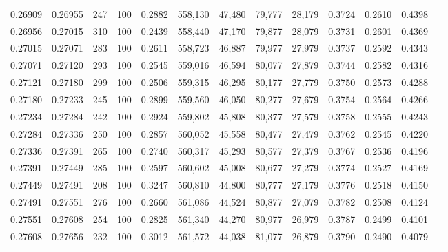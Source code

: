 \begin{tabular}{rrrrrrrrrrrrr}
0.26909 & 0.26955 &   247 & 100 &                                     0.2882 & 558,130 &  47,480 &  79,777 &  28,179 & 0.3724 & 0.2610 & 0.4398 \\
0.26956 & 0.27015 &   310 & 100 &                                     0.2439 & 558,440 &  47,170 &  79,877 &  28,079 & 0.3731 & 0.2601 & 0.4369 \\
0.27015 & 0.27071 &   283 & 100 &                                     0.2611 & 558,723 &  46,887 &  79,977 &  27,979 & 0.3737 & 0.2592 & 0.4343 \\
0.27071 & 0.27120 &   293 & 100 &                                     0.2545 & 559,016 &  46,594 &  80,077 &  27,879 & 0.3744 & 0.2582 & 0.4316 \\
0.27121 & 0.27180 &   299 & 100 &                                     0.2506 & 559,315 &  46,295 &  80,177 &  27,779 & 0.3750 & 0.2573 & 0.4288 \\
0.27180 & 0.27233 &   245 & 100 &                                     0.2899 & 559,560 &  46,050 &  80,277 &  27,679 & 0.3754 & 0.2564 & 0.4266 \\
0.27234 & 0.27284 &   242 & 100 &                                     0.2924 & 559,802 &  45,808 &  80,377 &  27,579 & 0.3758 & 0.2555 & 0.4243 \\
0.27284 & 0.27336 &   250 & 100 &                                     0.2857 & 560,052 &  45,558 &  80,477 &  27,479 & 0.3762 & 0.2545 & 0.4220 \\
0.27336 & 0.27391 &   265 & 100 &                                     0.2740 & 560,317 &  45,293 &  80,577 &  27,379 & 0.3767 & 0.2536 & 0.4196 \\
0.27391 & 0.27449 &   285 & 100 &                                     0.2597 & 560,602 &  45,008 &  80,677 &  27,279 & 0.3774 & 0.2527 & 0.4169 \\
0.27449 & 0.27491 &   208 & 100 &                                     0.3247 & 560,810 &  44,800 &  80,777 &  27,179 & 0.3776 & 0.2518 & 0.4150 \\
0.27491 & 0.27551 &   276 & 100 &                                     0.2660 & 561,086 &  44,524 &  80,877 &  27,079 & 0.3782 & 0.2508 & 0.4124 \\
0.27551 & 0.27608 &   254 & 100 &                                     0.2825 & 561,340 &  44,270 &  80,977 &  26,979 & 0.3787 & 0.2499 & 0.4101 \\
0.27608 & 0.27656 &   232 & 100 &                                     0.3012 & 561,572 &  44,038 &  81,077 &  26,879 & 0.3790 & 0.2490 & 0.4079 \\

\end{tabular}
